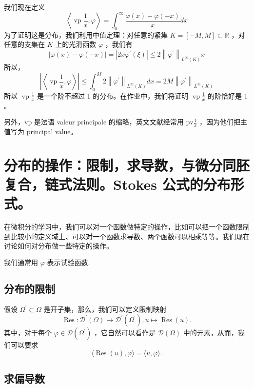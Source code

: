 我们现在定义
\[
\left\langle\operatorname{vp} \frac{1}{x}, \varphi\right\rangle=\int_0^{\infty} \frac{\varphi(x)-\varphi(-x)}{x} d x
\]
为了证明这是分布，我们利用中值定理：对任意的紧集 $K=[-M, M] \subset \mathbb{R}$ ，对任意的支集在 $K$ 上的光滑函数 $\varphi$ ，我们有
\[
|\varphi(x)-\varphi(-x)|=\left|2 x \varphi^{\prime}(\xi)\right| \leqslant 2\left\|\varphi^{\prime}\right\|_{L^{\infty}(K)} x
\]
所以，
\[
\left|\left\langle\operatorname{vp} \frac{1}{x}, \varphi\right\rangle\right| \leqslant \int_0^M 2\left\|\varphi^{\prime}\right\|_{L^{\infty}(K)} d x=2 M\left\|\varphi^{\prime}\right\|_{L^{\infty}(K)}
\]
所以 $\operatorname{vp} \frac{1}{x}$ 是一个阶不超过 1 的分布。在作业中，我们将证明 $\operatorname{vp} \frac{1}{x}$ 的阶恰好是 1 。

\begin{note}
另外，vp 是法语 valeur principale 的缩略，英文文献经常用 $\mathrm{pv} \frac{1}{x}$ ，因为他们把主值写为 principal value。
\end{note}
\section{分布的操作：限制，求导数，与微分同胚复合，链式法则。Stokes 公式的分布形式。}

在微积分的学习中，我们可以对一个函数做特定的操作，比如可以把一个函数限制到比较小的定义域上、可以对一个函数求导数、两个函数可以相乘等等。我们现在讨论如何对分布做一些特定的操作。

\begin{note}
我们通常用 $\varphi$ 表示试验函数.
\end{note}
\subsection{分布的限制}

假设 $\Omega^{\prime} \subset \Omega$ 是开子集，那么，我们可以定义限制映射
\[
\operatorname{Res} : \mathcal{D}^{\prime}(\Omega) \rightarrow \mathcal{D}^{\prime}\left(\Omega^{\prime}\right), u \mapsto \operatorname{Res}(u) .
\]
其中，对于每个 $\varphi \in \mathcal{D}\left(\Omega^{\prime}\right)$ ，它自然可以看作是 $\mathcal{D}(\Omega)$ 中的元素，从而，我们可以要求
\[
\langle\operatorname{Res}(u), \varphi\rangle=\langle u, \varphi\rangle .
\]
\subsection{求偏导数}

